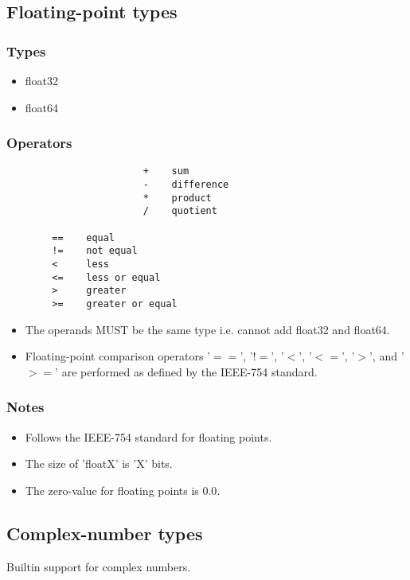 \documentclass{article}
\begin{document}
				
    	\subsection{Floating-point types}
			\subsubsection{Types}
			\begin{itemize}
    				\item float32
    				\item float64
			\end{itemize}
			\subsubsection{Operators}
				\begin{verbatim}
					    +    sum  
					    -    difference   
					    *    product       
					    /    quotient     
					    
	    ==    equal
	    !=    not equal
	    <     less
	    <=    less or equal
	    >     greater
	    >=    greater or equal
				\end{verbatim}	
				\begin{itemize}
					\item The operands MUST be the same type i.e. cannot add float32 and float64.
					\item Floating-point comparison operators '$==$', '$!=$', '$<$', '$<=$', '$>$', and '$>=$' are performed as defined by the IEEE-754 standard. 
				\end{itemize}
			\subsubsection{Notes}
				\begin{itemize}
					\item Follows the IEEE-754 standard for floating points. 
					\item The size of 'floatX' is 'X' bits. 
					\item The zero-value for floating points is \colorbox{code}{0.0}.
				\end{itemize}
				
				
    		\subsection{Complex-number types}
			Builtin support for complex numbers.
\end{document}
